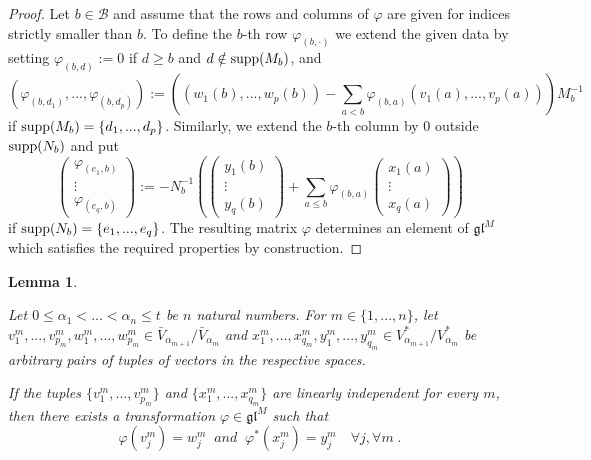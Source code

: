 \documentclass[12pt]{article}
\def\B  {\mathcal B}
\def\mk {\mathfrak}
\newtheorem{lemma}[theorem]{Lemma}
\begin{document}
\begin{proof}
Let $b\in \B$ and assume that the rows and columns of $\varphi$ are given for indices strictly smaller than $b$. To define the $b$-th row $\varphi_{(b,\cdot)}$ we extend the given data by setting $\varphi_{(b,d)}:=0$ if $d\geq b$ and $d\notin{\rm supp}(M_b)$, and
$$
(\varphi_{(b,d_1)},...,\varphi_{(b,d_p)}) :=((w_1(b),...,w_p(b))-\sum\limits_{a<b} \varphi_{(b,a)} (v_1(a),...,v_p(a))) M_b^{-1}
$$
if ${\rm supp}(M_b)=\{d_1,...,d_p\}$. Similarly, we extend the $b$-th column by $0$ outside ${\rm supp}(N_b)$ and put
$$
\begin{pmatrix} \varphi_{(e_1,b)}\\ \vdots\\ \varphi_{(e_q,b)}\end{pmatrix} :=-N_b^{-1}\left(\begin{pmatrix} y_1(b)\\ \vdots\\ y_q(b)\end{pmatrix}+\sum\limits_{a\leq b} \varphi_{(b,a)} \begin{pmatrix} x_1(a)\\ \vdots\\ x_q(a)\end{pmatrix}\right)
$$
if ${\rm supp}(N_b)=\{e_1,...,e_q\}$. The resulting matrix $\varphi$ determines an element of $\mk{gl}^M$ which satisfies the required properties by construction.
\end{proof}


\begin{lemma}\label{Lemma LinIndepToAny}

Let $0\leq\alpha_1<...<\alpha_n\leq t$ be $n$ natural numbers. For $m\in\{1,...,n\}$, let $v_1^m,...,v^m_{p_m},w_1^m,...,w_{p_m}^m\in\bar V_{\alpha_{m+1}}/\bar V_{\alpha_m}$ and $x_1^m,...,x_{q_m}^m,y_1^m,...,y_{q_m}^m\in V^*_{\alpha_{m+1}}/V^*_{\alpha_m}$ be arbitrary pairs of tuples of vectors in the respective spaces.

If the tuples $\{v^m_1,...,v^m_{p_m}\}$ and $\{x^m_1,...,x^m_{q_m}\}$ are linearly independent for every $m$, then there exists a transformation $\varphi\in\mk{gl}^M$ such that
$$
\varphi(v^m_j)=w^m_j \;\; and\;\; \varphi^*(x^m_j)=y^m_j \quad \forall j,\forall m \;.
$$
\end{lemma}
\end{document}
